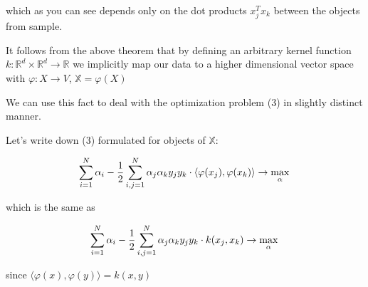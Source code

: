 \documentclass{article}
\theoremstyle{bfnote}
\begin{document}
	which as you can see depends only on the dot products $x_j^T x_k$ between the objects from sample.



	It follows from the above theorem that by defining an arbitrary kernel function
	$k:\mathbb{R}^d \times \mathbb{R}^d \rightarrow \mathbb{R}$ 
	we implicitly map our data to a higher dimensional vector space with $\varphi: X \rightarrow V$, $\mathbb{X} = \varphi(X)$
	
	
	We can use this fact to deal with the optimization problem (3) in slightly distinct manner.
	
	Let's write down (3) formulated for objects of $\mathbb{X}$:
	
	$$
	\sum_{i=1}^N {\alpha_i} - \frac{1}{2}\sum_{i,j=1}^N \alpha_j \alpha_k y_j y_k \cdot \langle \varphi(x_j), \varphi(x_k) \rangle
	\rightarrow \max\limits_{\alpha} \\
	$$
	
	which is the same as
	
	$$
		\sum_{i=1}^N {\alpha_i} - \frac{1}{2}\sum_{i,j=1}^N \alpha_j \alpha_k y_j y_k 
	\cdot k(x_j, x_k)
	\rightarrow \max\limits_{\alpha} \\
	$$
	
	since $\langle \varphi(x), \varphi(y) \rangle = k(x, y)$
	
		
\end{document}
